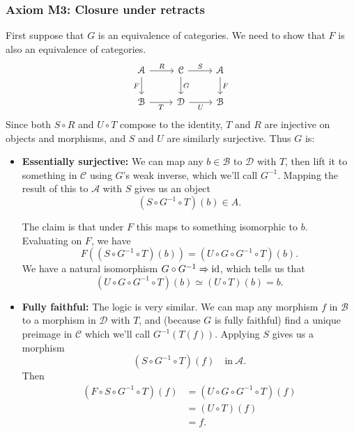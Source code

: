 \documentclass[main.tex]{subfiles}
\begin{document}
\subsubsection{Axiom M3: Closure under retracts}
First suppose that $G$ is an equivalence of categories. We need to show that $F$ is also an equivalence of categories.
\begin{equation*}
  \begin{tikzcd}
    \mathcal{A}
    \arrow[d, swap, "F"]
    \arrow[r, "R"]
    & \mathcal{C}
    \arrow[d, "G"]
    \arrow[r, "S"]
    & \mathcal{A}
    \arrow[d, "F"]
    \\
    \mathcal{B}
    \arrow[r, swap, "T"]
    & \mathcal{D}
    \arrow[r, swap, "U"]
    & \mathcal{B}
  \end{tikzcd}
\end{equation*}
Since both $S \circ R$ and $U \circ T$ compose to the identity, $T$ and $R$ are injective on objects and morphisms, and $S$ and $U$ are similarly surjective. Thus $G$ is:
\begin{itemize}
  \item \textbf{Essentially surjective:} We can map any $b \in \mathcal{B}$ to $\mathcal{D}$ with $T$, then lift it to something in $\mathcal{C}$ using $G$'s weak inverse, which we'll call $G ^{-1}$. Mapping the result of this to $\mathcal{A}$ with $S$ gives us an object
    \begin{equation*}
      (S \circ G^{-1} \circ T)(b) \in A.
    \end{equation*}

    The claim is that under $F$ this maps to something isomorphic to $b$. Evaluating on $F$, we have
    \begin{equation*}
      F((S \circ G^{-1} \circ T)(b)) = (U \circ G \circ G^{-1} \circ T)(b).
    \end{equation*}
    We have a natural isomorphism $G \circ G^{-1} \Rightarrow \mathrm{id}$, which tells us that
    \begin{equation*}
      (U \circ G \circ G^{-1} \circ T)(b) \simeq (U \circ T)(b) = b.
    \end{equation*}

  \item \textbf{Fully faithful:} The logic is very similar. We can map any morphism $f$ in $\mathcal{B}$ to a morphism in $\mathcal{D}$ with $T$, and (because $G$ is fully faithful) find a unique preimage in $\mathcal{C}$ which we'll call $G^{-1}(T(f))$. Applying $S$ gives us a morphism
    \begin{equation*}
      (S \circ G^{-1} \circ T)(f) \quad\text{in}\ \mathcal{A}.
    \end{equation*}
    Then
    \begin{align*}
      (F \circ S \circ G^{-1} \circ T)(f) &= (U \circ G \circ G^{-1} \circ T)(f) \\
      &= (U \circ T)(f) \\
      &= f.
    \end{align*}
\end{itemize}
\end{document}
